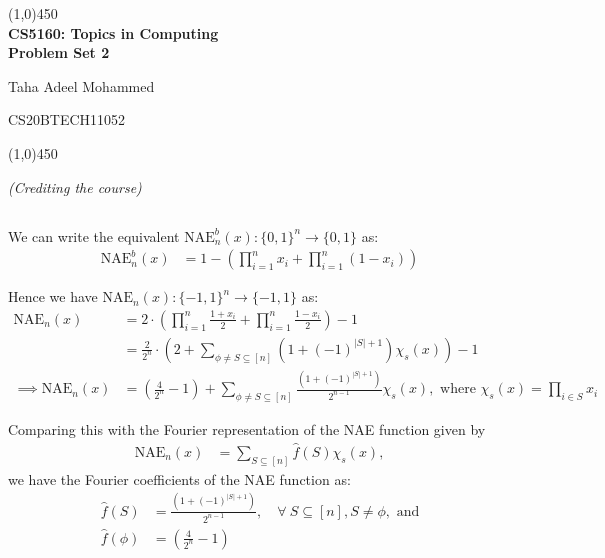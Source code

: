 \documentclass{article}
\renewcommand{\author}{Taha Adeel Mohammed}
\newcommand{\rollnumber}{CS20BTECH11052}
\newcommand{\course}{CS5160: Topics in Computing}
\newcommand{\assignment}{Problem Set 2}
\renewcommand{\maketitle}{
	\begin{center}
		\line(1,0){450} \\
		\vspace*{1ex}
        \Large{\textbf{\course}} \\
        \Large{\textbf{\assignment}} \\
    \end{center}
	\large{\author}
	\begin{flushright}
		\vspace*{-5ex}
		\rollnumber\\
	\end{flushright}
	\begin{center}
		\vspace*{-1ex}
		\line(1,0){450}
	\end{center}
}
\begin{document}
\maketitle

\textit{(Crediting the course)}

\subsection{}
\subsubsection{}
\vspace*{-8mm}

We can write the equivalent $\text{NAE}^b_n(x): {\{0, 1\}}^n \rightarrow \{0, 1\}$ as:
\begin{align*}
	\text{NAE}^b_n(x) &= 1 - \left(\prod_{i=1}^n x_i + \prod_{i=1}^n (1 - x_i)\right)
\end{align*}

\noindent
Hence we have $\text{NAE}_n(x): {\{-1, 1\}}^n \rightarrow \{-1, 1\}$ as:
\begin{align*}
	\text{NAE}_n(x) &= 2 \cdot \left(\prod_{i=1}^n \frac{1 + x_i}{2} + \prod_{i=1}^n \frac{1 - x_i}{2} \right) - 1 \\
	&= \frac{2}{2^n} \cdot \left(2 + \sum_{\phi \neq S \subseteq [n]}\left(1 + {(-1)}^{|S|+1} \right) \chi_s(x) \right) - 1 \\
\implies \text{NAE}_n(x) &= \boxed{\left(\frac{4}{2^n} - 1\right) + \sum_{\phi \neq S \subseteq [n]} \frac{ \left(1 + {(-1)}^{|S|+1} \right)}{2^{n - 1}}\chi_s(x),} \text{ where } \chi_s(x) = \prod_{i \in S} x_i
\end{align*}

\noindent
Comparing this with the Fourier representation of the NAE function given by
\begin{align*}
	\text{NAE}_n(x) &= \sum_{S \subseteq [n]} \hat{f}(S) \chi_s(x),
\end{align*}
we have the Fourier coefficients of the NAE function as:
\begin{align*}
	\hat{f}(S) &= \frac{ \left(1 + {(-1)}^{|S|+1} \right)}{2^{n - 1}}, \quad \forall\ S \subseteq [n], S \neq \phi, \text{ and} \\
	\hat{f}(\phi) &= \left(\frac{4}{2^n} - 1\right) \\
\end{align*}
\vspace*{-16mm}\begin{flushright}\qedsymbol\end{flushright}
\end{document}
